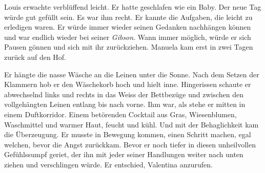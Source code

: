 Louis erwachte verblüffend leicht. Er hatte geschlafen wie ein Baby. 
Der neue Tag würde gut gefüllt sein. Es war ihm recht. Er kannte die Aufgaben, 
die leicht zu erledigen waren. Er würde immer wieder seinen Gedanken nachhängen können und  
war endlich wieder bei seiner \emph{Gibson}. Wann immer möglich, würde er sich Pausen gönnen 
und sich mit ihr zurückziehen. Manuela kam erst in zwei Tagen zurück auf den Hof.

Er hängte die nasse Wäsche an die Leinen unter die Sonne. Nach dem
Setzen der Klammern hob er den Wäschekorb hoch und hielt inne. Hingerissen schaute er abwechselnd links und rechts in das Weiss der Bettbezüge und zwischen den vollgehängten Leinen entlang bis nach vorne.
Ihm war, als stehe er mitten in einem Duftkorridor. Einem betörenden
Cocktail aus Gras, Wiesenblumen, Waschmittel und warmer Haut, feucht und
kühl. Und mit der Behaglichkeit kam die Überzeugung. Er musste in
Bewegung kommen, einen Schritt machen, egal welchen, bevor die Angst zurückkam.
Bevor er noch tiefer in diesen unheilvollen Gefühlssumpf geriet, der ihn mit jeder seiner Handlungen weiter nach unten ziehen und verschlingen  würde. Er entschied, Valentina anzurufen.
